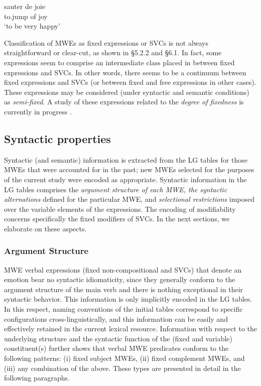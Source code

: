 \documentclass[output=paper]{langsci/langscibook}
\begin{document}
\begin{exe}
\ex \label{ex:3:11}
\gll sauter de joie\\
to.jump of joy\\
\glt ‘to be very happy’
\end{exe}


Classification of MWEs as fixed expressions or SVCs is not always
straightforward or clear-cut, as shown in  §5.2.2 and  §6.1. In
fact, some expressions seem to comprise an intermediate class placed in
between fixed expressions and SVCs. In other words, there seems to be a
continuum between fixed expressions and SVCs (or between fixed and free
expressions in other cases). These expressions may be considered (under
syntactic and semantic conditions) as \textit{semi-fixed}. A study of
these expressions related to the \textit{degree of fixedness} is
currently in progress \citep{constant2016}. 

\subsection{Syntactic properties}

Syntactic (and semantic) information is extracted from the LG tables for
those MWEs that were accounted for in the past; new MWEs selected for
the purposes of the current study were encoded as appropriate.
Syntactic information in the LG tables comprises the 
\textit{argument structure of each MWE, the syntactic
alternations} defined for the particular MWE, and
\textit{selectional restrictions }imposed over the variable
elements of the expressions. The encoding of modifiability concerns
specifically the fixed modifiers of SVCs. In the next sections, we elaborate on these
aspects.

\subsubsection{Argument Structure}



MWE verbal expressions (fixed non-compositional and SVCs) that denote an
emotion bear no syntactic idiomaticity, since they generally conform to
the argument structure of the main verb and there is nothing
exceptional in their syntactic behavior. This information is only
implicitly encoded in the LG tables. In this respect, naming
conventions of the initial tables correspond to specific configurations
cross-linguistically, and this information can be easily and
effectively retained in the current lexical resource. Information with
respect to the underlying structure and the syntactic function of the
(fixed and variable) constituent(s) further shows that verbal MWE
predicates conform to the following patterns: (i) fixed subject MWEs,
(ii) fixed complement MWEs, and (iii) any combination of the above.
These types are presented in detail in the following paragraphs. 
\end{document}
